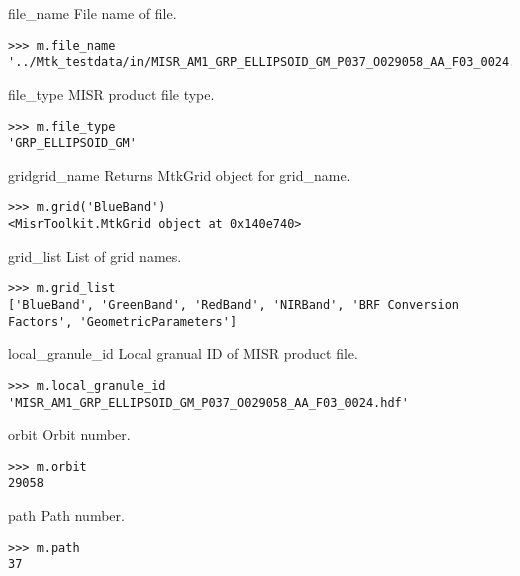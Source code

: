 \documentclass{howto}
\begin{document}
\begin{memberdesc}[char]{file_name}
  File name of file.

\begin{verbatim}
>>> m.file_name
'../Mtk_testdata/in/MISR_AM1_GRP_ELLIPSOID_GM_P037_O029058_AA_F03_0024.hdf'
\end{verbatim}
\end{memberdesc}

\begin{memberdesc}[char]{file_type}
  MISR product file type.

\begin{verbatim}
>>> m.file_type
'GRP_ELLIPSOID_GM'
\end{verbatim}
\end{memberdesc}

\begin{methoddesc}{grid}{grid_name}
  Returns MtkGrid object for grid_name.

\begin{verbatim}
>>> m.grid('BlueBand')
<MisrToolkit.MtkGrid object at 0x140e740>
\end{verbatim}
\end{methoddesc}

\begin{memberdesc}[list]{grid_list}
  List of grid names.

\begin{verbatim}
>>> m.grid_list
['BlueBand', 'GreenBand', 'RedBand', 'NIRBand', 'BRF Conversion Factors', 'GeometricParameters']
\end{verbatim}
\end{memberdesc}

\begin{memberdesc}[char]{local_granule_id}
  Local granual ID of MISR product file.

\begin{verbatim}
>>> m.local_granule_id
'MISR_AM1_GRP_ELLIPSOID_GM_P037_O029058_AA_F03_0024.hdf'
\end{verbatim}
\end{memberdesc}

\begin{memberdesc}[int]{orbit}
  Orbit number.

\begin{verbatim}
>>> m.orbit
29058
\end{verbatim}
\end{memberdesc}

\begin{memberdesc}[int]{path}
  Path number.

\begin{verbatim}
>>> m.path
37
\end{verbatim}
\end{memberdesc}
\end{document}
